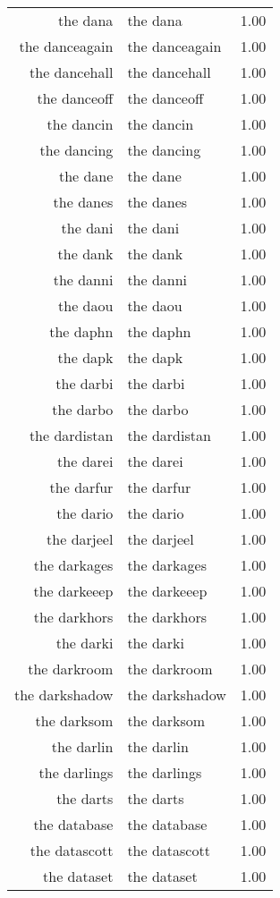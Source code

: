 \begin{table}[ht]
\begin{tabular}{rlr}
  the dana & the dana & 1.00 \\ 
  the danceagain & the danceagain & 1.00 \\ 
  the dancehall & the dancehall & 1.00 \\ 
  the danceoff & the danceoff & 1.00 \\ 
  the dancin & the dancin & 1.00 \\ 
  the dancing & the dancing & 1.00 \\ 
  the dane & the dane & 1.00 \\ 
  the danes & the danes & 1.00 \\ 
  the dani & the dani & 1.00 \\ 
  the dank & the dank & 1.00 \\ 
  the danni & the danni & 1.00 \\ 
  the daou & the daou & 1.00 \\ 
  the daphn & the daphn & 1.00 \\ 
  the dapk & the dapk & 1.00 \\ 
  the darbi & the darbi & 1.00 \\ 
  the darbo & the darbo & 1.00 \\ 
  the dardistan & the dardistan & 1.00 \\ 
  the darei & the darei & 1.00 \\ 
  the darfur & the darfur & 1.00 \\ 
  the dario & the dario & 1.00 \\ 
  the darjeel & the darjeel & 1.00 \\ 
  the darkages & the darkages & 1.00 \\ 
  the darkeeep & the darkeeep & 1.00 \\ 
  the darkhors & the darkhors & 1.00 \\ 
  the darki & the darki & 1.00 \\ 
  the darkroom & the darkroom & 1.00 \\ 
  the darkshadow & the darkshadow & 1.00 \\ 
  the darksom & the darksom & 1.00 \\ 
  the darlin & the darlin & 1.00 \\ 
  the darlings & the darlings & 1.00 \\ 
  the darts & the darts & 1.00 \\ 
  the database & the database & 1.00 \\ 
  the datascott & the datascott & 1.00 \\ 
  the dataset & the dataset & 1.00 \\ 

\end{tabular}
\end{table}
